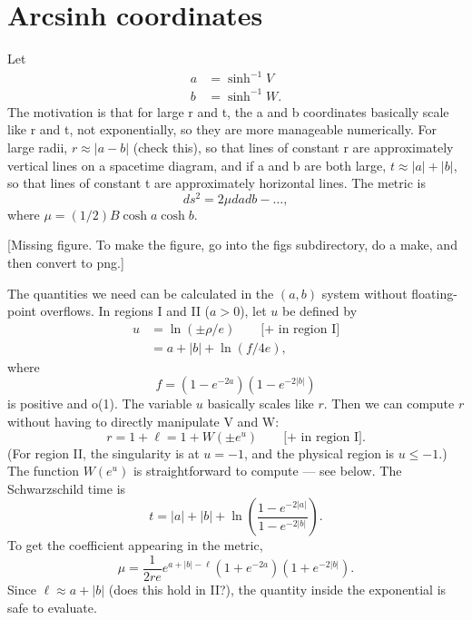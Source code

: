 \documentclass{article}
\begin{document}
\section{Arcsinh coordinates}

Let
\begin{align*}
  a & = \sinh^{-1} V \\
  b & = \sinh^{-1} W. 
\end{align*}
The motivation is that for large r and t, the
a and b coordinates basically scale like r and t, not exponentially, so they are more manageable numerically.
For large radii, $r\approx |a-b|$ (check this), so that lines of constant r are
approximately vertical lines on a spacetime diagram, and if a and b are both large,
$t\approx|a|+|b|$, so that lines of constant t are approximately horizontal lines.
The metric is
\begin{equation*}
  ds^2 = 2\mu dadb -\ldots,
\end{equation*}
where $\mu = (1/2)B\cosh a\cosh b$.

%
{%
  [Missing figure. To make the figure, go into the figs subdirectory, do a make, and then convert to png.]
}

The quantities we need can be calculated in the $(a,b)$ system without floating-point overflows.
In regions I and II ($a>0$), let $u$ be defined by
\begin{align*}
  u &= \ln(\pm \rho/e) \qquad \text{[+ in region I]} \\
    &= a+|b|+\ln(f/4e),
\end{align*}
where
\begin{equation*}
  f = (1-e^{-2a})(1-e^{-2|b|})
\end{equation*}
is positive and o(1). The variable $u$ basically scales like $r$.
Then we can compute $r$ without having to directly manipulate V and W:
\begin{equation*}
  r = 1+\ell=1+W(\pm e^u) \qquad \text{[+ in region I]}.
\end{equation*}
(For region II, the singularity is at $u=-1$, and the physical region is $u\le -1$.)
The function $W(e^u)$ is straightforward to compute --- see below.
The Schwarzschild time is
\begin{equation*}
  t = |a|+|b|+\ln\left(\frac{1-e^{-2|a|}}{1-e^{-2|b|}}\right).
\end{equation*}
To get the coefficient appearing in the metric,
\begin{equation*}
  \mu = \frac{1}{2re} e^{a+|b|-\ell}(1+e^{-2a})(1+e^{-2|b|}).
\end{equation*}
Since $\ell\approx a+|b|$ (does this hold in II?), the quantity inside the exponential is safe to evaluate.
\end{document}
